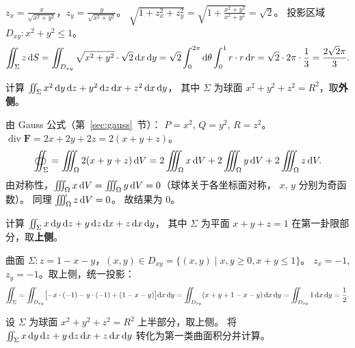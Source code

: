 \documentclass{article}
\DeclareMathOperator{\divergence}{div}
\begin{document}
\begin{solution}
  $z_x = \frac{x}{\sqrt{x^2+y^2}}$，$z_y = \frac{y}{\sqrt{x^2+y^2}}$。
  $\sqrt{1+z_x^2+z_y^2} = \sqrt{1+\frac{x^2+y^2}{x^2+y^2}} = \sqrt{2}$。
  投影区域 $D_{xy}: x^2+y^2 \le 1$。
  \[
    \iint_\Sigma z \,\mathrm{d} S
    = \iint_{D_{xy}} \sqrt{x^2+y^2} \cdot \sqrt{2} \,\mathrm{d} x\,\mathrm{d} y
    = \sqrt{2} \int_0^{2\pi} \mathrm{d}\theta \int_0^1 r \cdot r \,\mathrm{d} r
    = \sqrt{2} \cdot 2\pi \cdot \frac{1}{3}
    = \frac{2\sqrt{2}\pi}{3}.
  \]
\end{solution}

\begin{exercise}
  计算 $\iint_\Sigma x^2 \,\mathrm{d} y\,\mathrm{d} z + y^2 \,\mathrm{d} z\,\mathrm{d} x + z^2
  \,\mathrm{d} x\,\mathrm{d} y$，
  其中 $\Sigma$ 为球面 $x^2+y^2+z^2 = R^2$，取\textbf{外侧}。
\end{exercise}

\begin{solution}
  由 Gauss 公式（第~\ref{sec:gauss}~节）：
  $P = x^2$, $Q = y^2$, $R = z^2$。
  $\divergence \mathbf{F} = 2x + 2y + 2z = 2(x+y+z)$。
  \[
    \oiint_\Sigma = \iiint_\Omega 2(x+y+z) \,\mathrm{d} V
    = 2\iiint_\Omega x \,\mathrm{d} V + 2\iiint_\Omega y \,\mathrm{d} V +
    2\iiint_\Omega z \,\mathrm{d} V.
  \]
  由对称性，$\iiint_\Omega x \,\mathrm{d} V = \iiint_\Omega y \,\mathrm{d} V = 0$（球体关于各坐标面对称，
  $x$, $y$ 分别为奇函数）。
  同理 $\iiint_\Omega z \,\mathrm{d} V = 0$。
  故结果为 $0$。
\end{solution}

\begin{exercise}
  计算 $\iint_\Sigma x \,\mathrm{d} y\,\mathrm{d} z + y \,\mathrm{d} z\,\mathrm{d} x + z \,\mathrm{d}
  x\,\mathrm{d} y$，
  其中 $\Sigma$ 为平面 $x+y+z=1$ 在第一卦限部分，取\textbf{上侧}。
\end{exercise}

\begin{solution}
  曲面 $\Sigma: z = 1-x-y$，$(x,y) \in D_{xy} = \{(x,y) \mid x,y \ge 0,
  x+y \le 1\}$。
  $z_x = -1$, $z_y = -1$。取上侧，统一投影：
  \[
    \iint_\Sigma = \iint_{D_{xy}} \bigl[-x\cdot(-1) - y\cdot(-1) +
    (1-x-y)\bigr] \mathrm{d} x\,\mathrm{d} y
    = \iint_{D_{xy}} (x + y + 1 - x - y) \,\mathrm{d} x\,\mathrm{d} y
    = \iint_{D_{xy}} 1 \,\mathrm{d} x\,\mathrm{d} y = \frac{1}{2}.
  \]
\end{solution}

\begin{exercise}[两类曲面积分的转化]
  设 $\Sigma$ 为球面 $x^2+y^2+z^2=R^2$ 上半部分，取上侧。
  将 $\iint_\Sigma x \,\mathrm{d} y\,\mathrm{d} z + y \,\mathrm{d} z\,\mathrm{d} x + z \,\mathrm{d} x\,\mathrm{d} y$
  转化为第一类曲面积分并计算。
\end{exercise}
\end{document}
